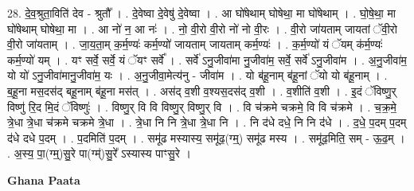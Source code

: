 \documentclass[17pt]{extarticle}
\begin{document}
28. दे॒व॒श्रुता॒विति॑ देव - श्रुतौ᳚ । . दे॒वेष्वा दे॒वेषु॑ दे॒वेष्वा । . आ घो॑षेथाम् घोषेथा॒ मा घो॑षेथाम् । . घो॒षे॒था॒ मा घो॑षेथाम् घोषेथा॒ मा । . आ नो॑ न॒ आ नः॑ । . नो॒ वी॒रो वी॒रो नो॑ नो वी॒रः । . वी॒रो जा॑यताम् जायतां ॅवी॒रो वी॒रो जा॑यताम् । . जा॒य॒ता॒म् क॒र्म॒ण्यः॑ कर्म॒ण्यो॑ जायताम् जायताम् कर्म॒ण्यः॑ । . क॒र्म॒ण्यो॑ यं ॅयम् क॑र्म॒ण्यः॑ कर्म॒ण्यो॑ यम् । . यꣳ सर्वे॒ सर्वे॒ यं ॅयꣳ सर्वे᳚ । . सर्वे॑ ऽनु॒जीवा॑मा नु॒जीवा॑म॒ सर्वे॒ सर्वे॑ ऽनु॒जीवा॑म । . अ॒नु॒जीवा॑म॒ यो यो॑ ऽनु॒जीवा॑मानु॒जीवा॑म॒ यः । . अ॒नु॒जीवा॒मेत्य॑नु - जीवा॑म । . यो ब॑हू॒नाम् ब॑हू॒नां ॅयो यो ब॑हू॒नाम् । . ब॒हू॒ना मस॒दस॑द् बहू॒नाम् ब॑हू॒ना मस॑त् । . अस॑द् व॒शी व॒श्यस॒दस॑द् व॒शी । . व॒शीति॑ व॒शी । . इ॒दं ॅविष्णु॒र् विष्णु॑ रि॒द मि॒दं ॅविष्णुः॑ । . विष्णु॒र् वि वि विष्णु॒र् विष्णु॒र् वि । . वि च॑क्रमे चक्रमे॒ वि वि च॑क्रमे । . च॒क्र॒मे॒ त्रे॒धा त्रे॒धा च॑क्रमे चक्रमे त्रे॒धा । . त्रे॒धा नि नि त्रे॒धा त्रे॒धा नि । . नि द॑धे दधे॒ नि नि द॑धे । . द॒धे॒ प॒दम् प॒दम् द॑धे दधे प॒दम् । . प॒दमिति॑ प॒दम् । . समू॑ढ मस्यास्य॒ समू॑ढ॒(ग्म्॒) समू॑ढ मस्य । . समू॑ढ॒मिति॒ सम् - ऊ॒ढ॒म् । . अ॒स्य॒ पा॒(ग्म्॒)सु॒रे पा(ग्म्॑)सु॒रे᳚ ऽस्यास्य पाꣳसु॒रे । \newline

\textbf{Ghana Paata } \newline
\end{document}

